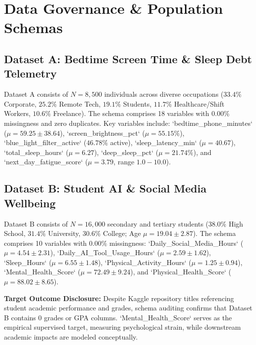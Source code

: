 \documentclass[10pt,twocolumn,a4paper]{article}
\begin{document}
\section{Data Governance \& Population Schemas}
\subsection{Dataset A: Bedtime Screen Time \& Sleep Debt Telemetry}
Dataset A consists of $N = 8,500$ individuals across diverse occupations ($33.4\%$ Corporate, $25.2\%$ Remote Tech, $19.1\%$ Students, $11.7\%$ Healthcare/Shift Workers, $10.6\%$ Freelance). The schema comprises 18 variables with $0.00\%$ missingness and zero duplicates. Key variables include: `bedtime\_phone\_minutes` ($\mu = 59.25 \pm 38.64$), `screen\_brightness\_pct` ($\mu = 55.15\%$), `blue\_light\_filter\_active` ($46.78\%$ active), `sleep\_latency\_min` ($\mu = 40.67$), `total\_sleep\_hours` ($\mu = 6.27$), `deep\_sleep\_pct` ($\mu = 21.74\%$), and `next\_day\_fatigue\_score` ($\mu = 3.79$, range $1.0-10.0$).

\subsection{Dataset B: Student AI \& Social Media Wellbeing}
Dataset B consists of $N = 16,000$ secondary and tertiary students ($38.0\%$ High School, $31.4\%$ University, $30.6\%$ College; Age $\mu = 19.04 \pm 2.87$). The schema comprises 10 variables with $0.00\%$ missingness: `Daily\_Social\_Media\_Hours` ($\mu = 4.54 \pm 2.31$), `Daily\_AI\_Tool\_Usage\_Hours` ($\mu = 2.59 \pm 1.62$), `Sleep\_Hours` ($\mu = 6.55 \pm 1.48$), `Physical\_Activity\_Hours` ($\mu = 1.25 \pm 0.94$), `Mental\_Health\_Score` ($\mu = 72.49 \pm 9.24$), and `Physical\_Health\_Score` ($\mu = 88.02 \pm 8.65$).

\begin{tcolorbox}
\textbf{Target Outcome Disclosure:} Despite Kaggle repository titles referencing student academic performance and grades, schema auditing confirms that Dataset B contains 0 grades or GPA columns. `Mental\_Health\_Score` serves as the empirical supervised target, measuring psychological strain, while downstream academic impacts are modeled conceptually.
\end{tcolorbox}
\end{document}
